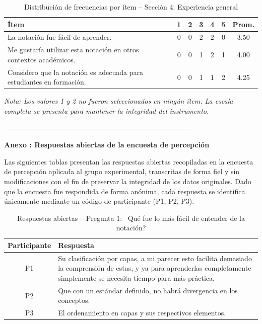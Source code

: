 \begin{table}[H]
\centering
\caption{Distribución de frecuencias por ítem -- Sección 4: Experiencia general}
\label{tab:frecuencias_seccion4}
\begin{tabular}{|p{7cm}|c|c|c|c|c|c|}
\hline
\textbf{Ítem} & \textbf{1} & \textbf{2} & \textbf{3} & \textbf{4} & \textbf{5} & \textbf{Prom.} \\
\hline
La notación fue fácil de aprender. & 0 & 0 & 2 & 2 & 0 & 3.50 \\
\hline
Me gustaría utilizar esta notación en otros contextos académicos. & 0 & 0 & 1 & 2 & 1 & 4.00 \\
\hline
Considero que la notación es adecuada para estudiantes en formación. & 0 & 0 & 1 & 1 & 2 & 4.25 \\
\hline
\end{tabular}
\end{table}
\noindent
\textit{Nota: Los valores 1 y 2 no fueron seleccionados en ningún ítem. 
La escala completa se presenta para mantener la integridad del instrumento.}

--------------------------------------------------------------------------------
\FloatBarrier
\cleardoublepage
{}
{}

\vspace{40pt}
{\centering \normalfont\huge\bfseries Anexo \theanexo: Respuestas abiertas de la encuesta de percepción \par}
\vspace{40pt}

\label{anx:respuestas_abiertas}
\noindent
Las siguientes tablas presentan las respuestas abiertas recopiladas en la encuesta de percepción aplicada al grupo experimental, transcritas de forma fiel y sin modificaciones con el fin de preservar la integridad de los datos originales. Dado que la encuesta fue respondida de forma anónima, cada respuesta se identifica únicamente mediante un código de participante (P1, P2, P3).

\begin{table}[H]
\centering
\caption{Respuestas abiertas -- Pregunta 1:  \textquestiondown~Qué fue lo más fácil de entender de la notación?}
\label{tab:abiertas_p1}
\begin{tabular}{|c|p{11cm}|}
\hline
\textbf{Participante} & \textbf{Respuesta} \\
\hline
P1 & Su clasificación por capas, a mi parecer esto facilita demasiado la comprensión de estas, y ya para aprenderlas completamente simplemente se necesita tiempo para más práctica. \\
\hline
P2 & Que con un estándar definido, no habrá divergencia en los conceptos. \\
\hline
P3 & El ordenamiento en capas y sus respectivos elementos. \\
\hline
\end{tabular}
\end{table}


